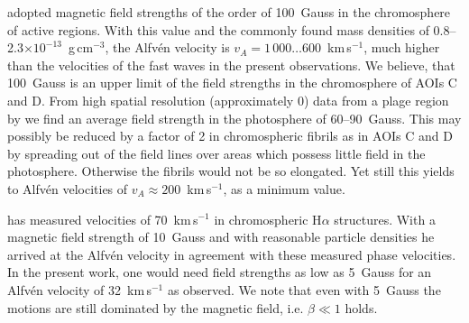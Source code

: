 \citet{2004Natur.430..536D} adopted magnetic field strengths of the order of 100~Gauss in the chromosphere of active regions. With this value and the commonly found mass densities of 0.8--2.3$\times10^{-13}$~g\,cm$^{-3}$, the Alfv\'en velocity is $v_A=1\,000\dots600$~km\,s$^{-1}$, much higher than the velocities of the fast waves in the present observations. We believe, that 100~Gauss is an upper limit of the field strengths in the chromosphere of AOIs C and D. From high spatial resolution (approximately 0) data from a plage region by \citet{Gonzalez:2007fk} we find an average field strength in the photosphere of 60--90~Gauss. This may possibly be reduced by a factor of 2 in chromospheric fibrils as in AOIs C and D by spreading out of the field lines over areas which possess little field in the photosphere. Otherwise the fibrils would not be so elongated. Yet still this yields to Alfv\'en velocities of $v_A\approx200$~km\,s$^{-1}$, as a minimum value.

\citet{1975SoPh...44..299G} has measured velocities of 70~km\,s$^{-1}$ in chromospheric H$\alpha$ structures. With a magnetic field strength of 10~Gauss and with reasonable particle densities he arrived at the Alfv\'en velocity in agreement with these measured phase velocities. In the present work, one would need field strengths as low as 5~Gauss for an Alfv\'en velocity of 32~km\,s$^{-1}$ as observed. We note that even with 5~Gauss the motions are still dominated by the magnetic field, i.e. $\beta\ll1$ holds.

